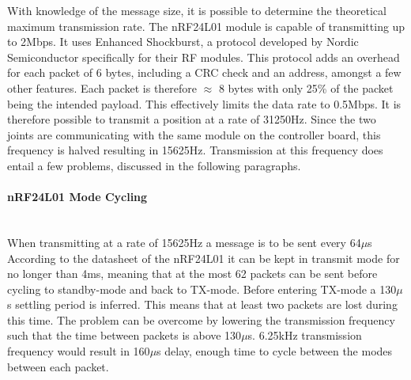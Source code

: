 {With knowledge of the message size, it is possible to determine the theoretical maximum transmission rate.
The nRF24L01 module is capable of transmitting up to 2Mbps.
It uses Enhanced Shockburst, a protocol developed by Nordic Semiconductor specifically for their RF modules.
This protocol adds an overhead for each packet of 6 bytes, including a CRC check and an address, amongst a few other features.
Each packet is therefore $\approx$ 8 bytes with only 25\% of the packet being the intended payload.
This effectively limits the data rate to 0.5Mbps.
It is therefore possible to transmit a position at a rate of 31250Hz.
Since the two joints are communicating with the same module on the controller board, this frequency is halved resulting in 15625Hz.
Transmission at this frequency does entail a few problems, discussed in the following paragraphs.
\paragraph{nRF24L01 Mode Cycling}~\\ %
\label{par:nrf24l01_mode_cycling}
When transmitting at a rate of 15625Hz a message is to be sent every 64$\mu$s
According to the datasheet of the nRF24L01 it can be kept in transmit mode for no longer than 4ms, meaning that at the most 62 packets can be sent before cycling to standby-mode and back to TX-mode.
Before entering TX-mode a 130$\mu$s settling period is inferred.
This means that at least two packets are lost during this time.
The problem can be overcome by lowering the transmission frequency such that the time between packets is above 130$\mu$s.
6.25kHz transmission frequency would result in 160$\mu$s delay, enough time to cycle between the modes between each packet.
}
